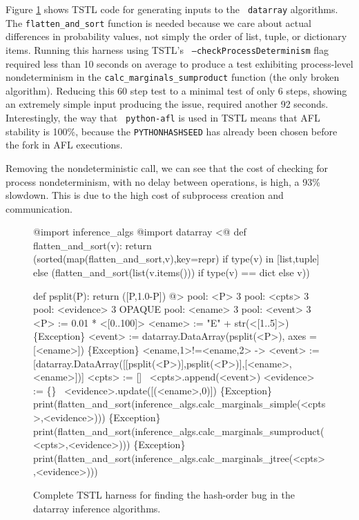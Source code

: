 Figure \ref{hashbug} shows TSTL code for generating inputs to the {\tt
  datarray} algorithms.  The {\tt flatten\_and\_sort} function is needed because we care about actual differences in probability values, not simply the order of list, tuple, or dictionary items.  Running this harness using TSTL's {\tt
  --checkProcessDeterminism} flag required less than 10 seconds on
average to produce a test exhibiting process-level nondeterminism in
the {\tt calc\_marginals\_sumproduct} function (the only broken
algorithm).  Reducing this 60 step test to a minimal test of only 6 steps,
showing an extremely simple input producing the issue, 
required another 92 seconds.  Interestingly, the way that {\tt
  python-afl} is used in TSTL means that AFL stability is 100\%,
because the {\tt PYTHONHASHSEED} has already been chosen before the
fork in AFL executions.

Removing the nondeterministic call, we can see that the cost of
checking for process nondeterminism, with no delay between operations,
is high, a 93\% slowdown.  This is due to the high cost of subprocess
creation and communication.

\begin{figure}
{\scriptsize
\begin{code}
@import inference\_algs
@import datarray
\vspace{0.1in}
<@
def flatten\_and\_sort(v):
    return (sorted(map(flatten\_and\_sort,v),key=repr) if type(v) in [list,tuple] else
                (flatten\_and\_sort(list(v.items())) if type(v) == dict else v))

def psplit(P):
    return ([P,1.0-P])
@>
\vspace{0.1in}
pool: <P> 3
pool: <cpts> 3
pool: <evidence> 3 OPAQUE
pool: <ename> 3
pool: <event> 3
\vspace{0.1in}
<P> := 0.01 * <[0..100]>
<ename> := "E" + str(<[1..5]>)
\{Exception\} <event> := datarray.DataArray(psplit(<P>), axes = [<ename>])
\{Exception\} <ename,1>!=<ename,2> -> <event> := [datarray.DataArray([[psplit(<P>)],psplit(<P>)],[<ename>,<ename>])]
<cpts> := []
~<cpts>.append(<event>)
<evidence> := \{\}
~<evidence>.update([(<ename>,0)])
\vspace{0.1in}
\{Exception\} print(flatten\_and\_sort(inference\_algs.calc\_marginals\_simple(<cpts>,<evidence>)))
\{Exception\} print(flatten\_and\_sort(inference\_algs.calc\_marginals\_sumproduct(<cpts>,<evidence>)))
\{Exception\} print(flatten\_and\_sort(inference\_algs.calc\_marginals\_jtree(<cpts>,<evidence>)))
\end{code}
}
\caption {Complete TSTL harness for finding the hash-order bug in the datarray
  inference algorithms.}
\label{hashbug}
\end{figure}

